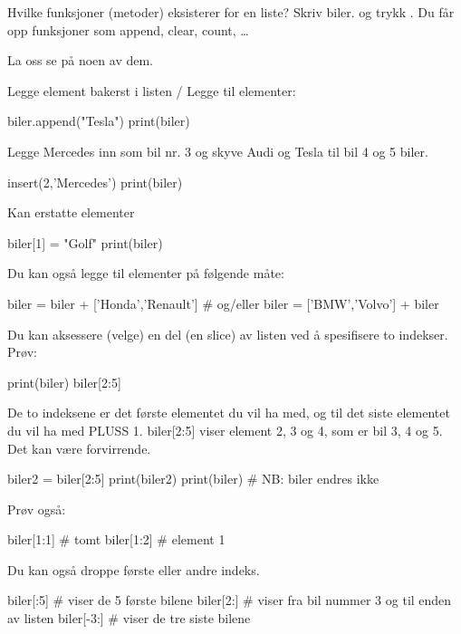 {Hvilke funksjoner (metoder) eksisterer for en liste? Skriv biler. og trykk . Du får opp funksjoner som append, clear, count, \ldots

La oss se på noen av dem. 

Legge element bakerst i listen / Legge til elementer:

\begin{usncodebox}
biler.append("Tesla")
print(biler)
\end{usncodebox}

Legge Mercedes inn som bil nr. 3 og skyve Audi og Tesla til bil 4 og 5 biler.

\begin{usncodebox}
insert(2,'Mercedes')
print(biler)
\end{usncodebox}

Kan erstatte elementer

\begin{usncodebox}
biler[1] = "Golf"
print(biler)
\end{usncodebox}

Du kan også legge til elementer på følgende måte:

\begin{usncodebox}
biler = biler + ['Honda','Renault']
# og/eller
biler = ['BMW','Volvo'] + biler
\end{usncodebox}

Du kan aksessere (velge) en del (en slice) av listen ved å spesifisere to indekser. Prøv: 

\begin{usncodebox}
print(biler)
biler[2:5]
\end{usncodebox}

De to indeksene er det første elementet du vil ha med, og til det siste elementet du vil ha med PLUSS 1. biler[2:5] viser element 2, 3 og 4, som er bil 3, 4 og 5. Det kan være forvirrende. 

\begin{usncodebox}
biler2 = biler[2:5] 
print(biler2)
print(biler)          # NB: biler endres ikke 
\end{usncodebox}

Prøv også:

\begin{usncodebox}
biler[1:1]   # tomt
biler[1:2]   # element 1
\end{usncodebox}

Du kan også droppe første eller andre indeks.

\begin{usncodebox}
biler[:5]     # viser de 5 første bilene
biler[2:]     # viser fra bil nummer 3 og til enden av listen
biler[-3:]    # viser de tre siste bilene
\end{usncodebox}

}
